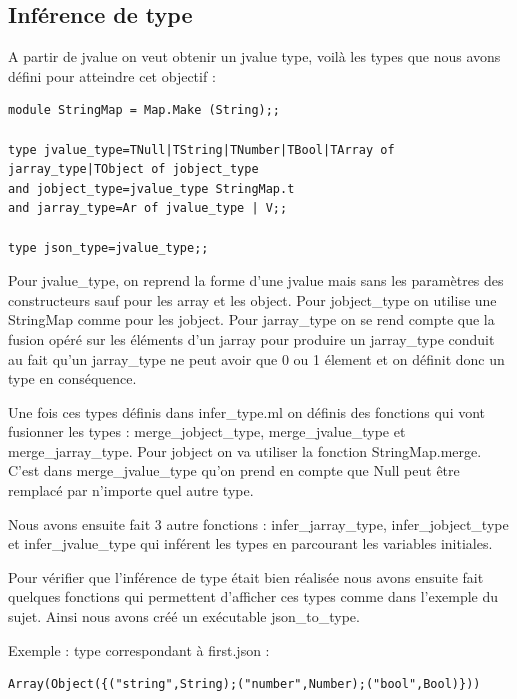 \documentclass{report}
\begin{document}
\subsection{Inférence de type}
\par
A partir de jvalue on veut obtenir un jvalue type, voilà les types que nous avons défini pour atteindre cet objectif :
\\
\begin{verbatim}
module StringMap = Map.Make (String);;

type jvalue_type=TNull|TString|TNumber|TBool|TArray of jarray_type|TObject of jobject_type
and jobject_type=jvalue_type StringMap.t
and jarray_type=Ar of jvalue_type | V;;

type json_type=jvalue_type;;
\end{verbatim}
Pour jvalue\_type, on reprend la forme d'une jvalue mais sans les paramètres des constructeurs sauf pour les array et les object. Pour jobject\_type on utilise une StringMap comme pour les jobject. Pour jarray\_type on se rend compte que la fusion opéré sur les éléments d'un jarray pour produire un jarray\_type conduit au fait qu'un jarray\_type ne peut avoir que 0 ou 1 élement et on définit donc un type en conséquence.

\par
Une fois ces types définis dans infer\_type.ml on définis des fonctions qui vont fusionner les types : merge\_jobject\_type, merge\_jvalue\_type et merge\_jarray\_type. Pour jobject on va utiliser la fonction StringMap.merge. C'est dans merge\_jvalue\_type qu'on prend en compte que Null peut être remplacé par n'importe quel autre type.

\par
Nous avons ensuite fait 3 autre fonctions : infer\_jarray\_type, infer\_jobject\_type et infer\_jvalue\_type qui inférent les types en parcourant les variables initiales.

\par
Pour vérifier que l'inférence de type était bien réalisée nous avons ensuite fait quelques fonctions qui permettent d'afficher ces types comme dans l'exemple du sujet. Ainsi nous avons créé un exécutable json\_to\_type.

Exemple : type correspondant à first.json :
\\
\begin{verbatim}
Array(Object({("string",String);("number",Number);("bool",Bool)}))
\end{verbatim}
\end{document}
